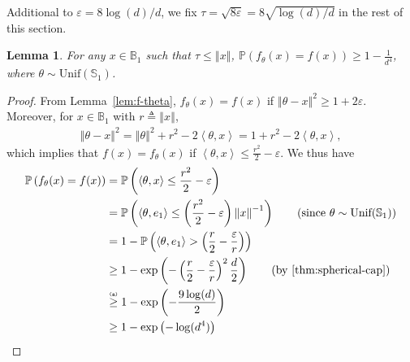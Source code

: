 \documentclass[letter, 12pt]{report}
\newcommand{\explan}[1]{\stackrel{\text{\tiny \texttt{#1}}}}
\newcommand{\ip}[1]{\left \langle #1 \right \rangle}
\newcommand{\sphere}{\mathbb{S}}
\newcommand{\ball}{\mathbb{B}}
\newcommand{\paren}[1]{\left( #1 \right)}
\newcommand{\norm}[1]{\left \Vert  #1 \right \Vert}
\newcommand{\1}{\mathbf{1}}
\newcommand{\mP}{\mathbb{P}}
\renewcommand{\epsilon}{\varepsilon}
\theoremstyle{plain}
\newtheorem{lemma}[theorem]{Lemma}
\theoremstyle{definition}
\theoremstyle{remark}
\begin{document}
Additional to $\epsilon=8\log(d)/d$, we fix $\tau = \sqrt{8\epsilon} = 8\sqrt{\log(d)/d}$ in the rest of this section.
\begin{lemma}{\label{lem:inf-lower-large-r}}
    For any $x \in \mathbb{B}_1$
    such that $\tau \leq \norm{x}$,
    $\displaystyle \mP\paren{
            f_\theta(x) = f(x)
        }
        \geq 1 - \frac{1}{d^4}$,
    where $\theta \sim \text{Unif}(\sphere_1)$.
\end{lemma}
\begin{proof}
    From Lemma~\ref{lem:f-theta},
    $f_\theta(x) = f(x)$ if $\norm{\theta - x}^2 \geq 1 + 2\epsilon$.
    Moreover, for $x \in \ball_1$ with $r \triangleq \norm{x}$,
    \begin{align*}
        \norm{\theta - x}^2
        = \norm{\theta}^2 + r^2 - 2\ip{\theta, x}
        = 1 + r^2 - 2\ip{\theta, x},
    \end{align*}
    which implies that $f(x) = f_\theta(x)$ if $\ip{\theta, x} \leq \frac{r^2}{2} - \epsilon$.
    We thus have
    \begin{align*}
        \mP\left(
        f_\theta(x) = f(x)
        \right)
         & =
        \mP\paren{
            \ip{\theta, x} \leq \frac{r^2}{2} - \epsilon
        }       \\
         & =
        \mP\paren{
            \ip{\theta, e_1} \leq \paren{\frac{r^2}{2} - \epsilon}\norm{x}^{-1}
        }
        \tag{since $\theta \sim \text{Unif}(\sphere_1)$}
        \\
         & =
        1 -
        \mP\paren{
            \ip{\theta, e_1} > \paren{\frac{r}{2} - \frac{\epsilon}{r}}
        }
        \\
         & \geq
        1
        -
        \exp\paren{
            -
            \paren{\frac{r}{2} - \frac{\epsilon}{r}}^2
            \frac{d}{2}
        }
        \tag{by \cref{thm:spherical-cap}}
        \\
         &
        \explan{(a)}
        \geq
        1
        -
        \exp
        \paren{
            -
            \frac{9\log(d)}{2}
        }
        \\
         & \geq
        1
        -
        \exp
        \paren{-\log(d^{4})}
        \\

\end{align*}
\end{proof}
\end{document}

